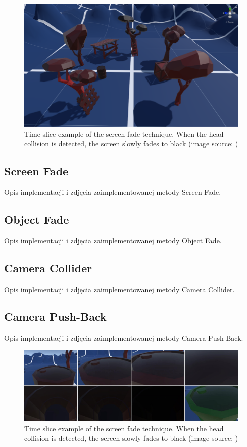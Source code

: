 \begin{figure}[th]
\centering
\includegraphics[width=1\textwidth]{img/virtual_environment.png}
\caption{Time slice example of the screen fade technique. When the head collision is detected, the screen slowly fades to black (image source: \cite{SCREENFADE})}
\label{fig:veimplementation}
\end{figure}

\subsection{Screen Fade}

Opis implementacji i zdjęcia zaimplementowanej metody Screen Fade.

\subsection{Object Fade}

Opis implementacji i zdjęcia zaimplementowanej metody Object Fade.

\subsection{Camera Collider}

Opis implementacji i zdjęcia zaimplementowanej metody Camera Collider.

\subsection{Camera Push-Back}

Opis implementacji i zdjęcia zaimplementowanej metody Camera Push-Back.

\begin{figure}[th]
\centering
\includegraphics[width=1\textwidth]{img/teleport_implementation.jpg}
\caption{Time slice example of the screen fade technique. When the head collision is detected, the screen slowly fades to black (image source: \cite{SCREENFADE})}
\label{fig:teleportimplementation}
\end{figure}

